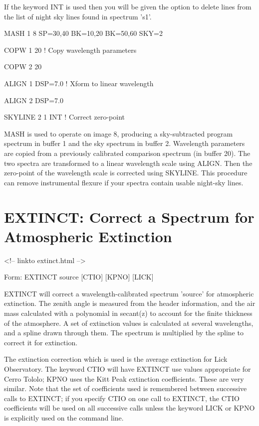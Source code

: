 If the keyword INT is used then you will be given the option to delete
lines from the list of night sky lines found in spectrum 's1'.

\begin{example}
  \item[MASH 1 8 SP=30,40 BK=10,20 BK=50,60 SKY=2\hfill]{}
  \item[COPW 1 20\hfill]{! Copy wavelength parameters}
  \item[COPW 2 20\hfill]{}
  \item[ALIGN 1 DSP=7.0\hfill]{! Xform to linear wavelength}
  \item[ALIGN 2 DSP=7.0\hfill]{}
  \item[SKYLINE 2 1 INT\hfill]{! Correct zero-point}
\end{example}
MASH is used to operate on image 8, producing a sky-subtracted program
spectrum in buffer 1 and the sky spectrum in buffer 2.  Wavelength
parameters are copied from a previously calibrated comparison spectrum (in
buffer 20). The two spectra are transformed to a linear wavelength scale
using ALIGN. Then the zero-point of the wavelength scale is corrected using
SKYLINE.  This procedure can remove instrumental flexure if your spectra
contain usable night-sky lines.

\section{EXTINCT: Correct a Spectrum for Atmospheric Extinction}
\begin{rawhtml}
<!-- linkto extinct.html -->
\end{rawhtml}
\begin{command}
  \item[Form: EXTINCT source {[CTIO]} {[KPNO]} {[LICK]}\hfill]{}
\end{command}

EXTINCT will correct a wavelength-calibrated spectrum 'source' for
atmospheric extinction.  The zenith angle is measured from the header
information, and the air mass calculated with a polynomial in secant(z) to
account for the finite thickness of the atmosphere.  A set of extinction
values is calculated at several wavelengths, and a spline drawn through
them.  The spectrum is multiplied by the spline to correct it for
extinction.

The extinction correction which is used is the average extinction for Lick
Observatory.  The keyword CTIO will have EXTINCT use values appropriate for
Cerro Tololo; KPNO uses the Kitt Peak extinction coefficients.  These are
very similar. Note that the set of coefficients used is remembered between
successive calls to EXTINCT; if you specify CTIO on one call to EXTINCT,
the CTIO coefficients will be used on all successive calls unless the
keyword LICK or KPNO is explicitly used on the command line.

